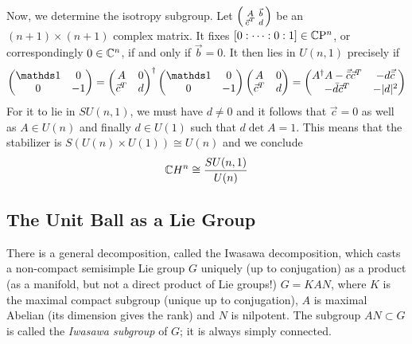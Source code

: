 Now, we determine the isotropy subgroup. Let 
$\begin{psmallmatrix}
	A & \vec b \\
	\vec c^T & d
\end{psmallmatrix}$ be an $(n+1)\times (n+1)$ complex matrix. It fixes $[0:\dots:0:1]\in \mathbb{C}\mathrm{P}^n$, or correspondingly $0\in\mathbb{C}^n$, if and only if $\vec b=0$. It then lies in $U(n,1)$ precisely if 
\begin{equation*}
	\begin{pmatrix}
		\Unit & 0 \\ 0 & -1
	\end{pmatrix}
	=
	\begin{pmatrix}
		A & 0 \\ \vec c^T & d
	\end{pmatrix}^\dagger 
	\begin{pmatrix}
		\Unit & 0 \\ 0 & -1 
	\end{pmatrix}
	\begin{pmatrix}
		A & 0 \\ \vec c^T & d
	\end{pmatrix}
	=
	\begin{pmatrix}
		A^\dagger A-\vec{\bar c}\vec c^T & -d \vec{\bar c}\\
		-\bar d \vec c^T & -\abs{d}^2
	\end{pmatrix}
\end{equation*}
For it to lie in $SU(n,1)$, we must have $d\neq 0$ and it follows that $\vec c=0$ as well as $A\in U(n)$ and finally $d\in U(1)$ such that $d \det A=1$. This means that the stabilizer is $S(U(n)\times U(1))\cong U(n)$ and we conclude
\begin{equation*}
	\mathbb{C} H^n\cong \frac{SU(n,1)}{U(n)}
\end{equation*}

\subsection{The Unit Ball as a Lie Group}

There is a general decomposition, called the Iwasawa decomposition, which casts a non-compact semisimple Lie group $G$ uniquely (up to conjugation) as a product (as a manifold, but not a direct product of Lie groups!) $G=KAN$, where $K$ is the maximal compact subgroup (unique up to conjugation), $A$ is maximal Abelian (its dimension gives the rank) and $N$ is nilpotent. The subgroup $AN\subset G$ is called the \emph{Iwasawa subgroup} of $G$; it is always simply connected. 


